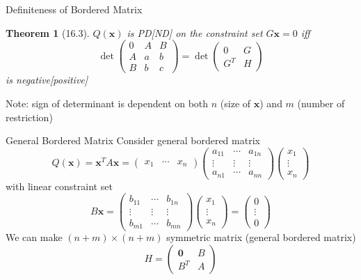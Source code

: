 \documentclass[a4paper,11pt]{article}
\newtheorem{thm}{Theorem}
\newcommand{\bd}{\mathbf}
\begin{document}
\begin{frame}[t]{Definiteness of Bordered Matrix}
	\begin{thm}
		[16.3] $Q(\bd{x})$ is PD[ND] on the constraint set $G\bd{x}=0$ iff\[
			\det \begin{pmatrix}
							0&A&B\\
							A&a&b\\
							B&b&c
						\end{pmatrix}=\det \begin{pmatrix}
							0&G\\
							G^T&H
						\end{pmatrix}
		\] is negative[positive]
	\end{thm}
	Note: sign of determinant is dependent on both $n$ (size of $\bd{x}$) and $m$ (number of restriction)
\end{frame}

\begin{frame}[t]{General Bordered Matrix}
	Consider general bordered matrix \[
				Q(\bd{x})=\bd{x}^T A \bd{x} = \begin{pmatrix}
					x_1 &\cdots& x_n
				\end{pmatrix}\begin{pmatrix}
					a_{11} & \cdots & a_{1n}\\
					\vdots & \vdots & \vdots\\
					a_{n1} & \cdots & a_{nn}
				\end{pmatrix}\begin{pmatrix}
					x_1\\\vdots\\x_n
				\end{pmatrix}
			\] with linear constraint set\[
				B\bd{x}=\begin{pmatrix}
					b_{11}&\cdots&b_{1n}\\
					\vdots&\vdots&\vdots\\
					b_{m1}&\cdots&b_{mn}
				\end{pmatrix}\begin{pmatrix}
					x_1\\\vdots\\x_n
				\end{pmatrix}=\begin{pmatrix}
					0\\\vdots\\0
				\end{pmatrix}
			\]
			We can make $(n+m)\times(n+m)$ symmetric matrix (general bordered matrix) \[
				H = \begin{pmatrix}
					\bd{0}&B\\
					B^T&A
				\end{pmatrix}
			\]
\end{frame}
\end{document}
